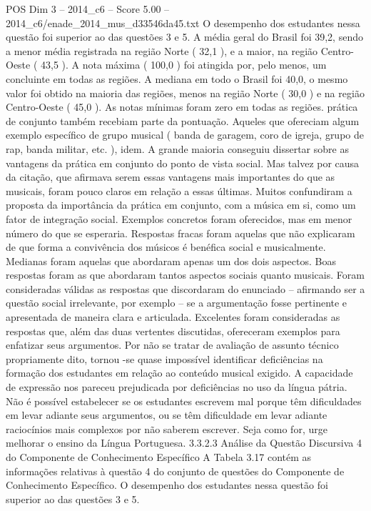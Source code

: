 \begin{textsample}{POS Dim 3 – 2014\_c6 – Score 5.00 – 2014\_c6/enade\_2014\_mus\_d33546da45.txt}
O desempenho dos estudantes nessa questão foi superior ao das questões 3 e 5.
A média geral do Brasil foi 39,2, sendo a menor média registrada na região Norte ( 32,1 ), e a maior, na região Centro-Oeste ( 43,5 ).
A nota máxima ( 100,0 ) foi atingida por, pelo menos, um concluinte em todas as regiões.
A mediana em todo o Brasil foi 40,0, o mesmo valor foi obtido na maioria das regiões, menos na região Norte ( 30,0 ) e na região Centro-Oeste ( 45,0 ).
As notas mínimas foram zero em todas as regiões. prática de conjunto também recebiam parte da pontuação.
Aqueles que ofereciam algum exemplo específico de grupo musical ( banda de garagem, coro de igreja, grupo de rap, banda militar, etc. ), idem.
A grande maioria conseguiu dissertar sobre as vantagens da prática em conjunto do ponto de vista social.
Mas talvez por causa da citação, que afirmava serem essas vantagens mais importantes do que as musicais, foram pouco claros em relação a essas últimas.
Muitos confundiram a proposta da importância da prática em conjunto, com a música em si, como um fator de integração social.
Exemplos concretos foram oferecidos, mas em menor número do que se esperaria.
Respostas fracas foram aquelas que não explicaram de que forma a convivência dos músicos é benéfica social e musicalmente.
Medianas foram aquelas que abordaram apenas um dos dois aspectos.
Boas respostas foram as que abordaram tantos aspectos sociais quanto musicais.
Foram consideradas válidas as respostas que discordaram do enunciado – afirmando ser a questão social irrelevante, por exemplo – se a argumentação fosse pertinente e apresentada de maneira clara e articulada.
Excelentes foram consideradas as respostas que, além das duas vertentes discutidas, ofereceram exemplos para enfatizar seus argumentos.
Por não se tratar de avaliação de assunto técnico propriamente dito, tornou -se quase impossível identificar deficiências na formação dos estudantes em relação ao conteúdo musical exigido.
A capacidade de expressão nos pareceu prejudicada por deficiências no uso da língua pátria.
Não é possível estabelecer se os estudantes escrevem mal porque têm dificuldades em levar adiante seus argumentos, ou se têm dificuldade em levar adiante raciocínios mais complexos por não saberem escrever.
Seja como for, urge melhorar o ensino da Língua Portuguesa. 3.3.2.3 Análise da Questão Discursiva 4 do Componente de Conhecimento Específico A Tabela 3.17 contém as informações relativas à questão 4 do conjunto de questões do Componente de Conhecimento Específico.
O desempenho dos estudantes nessa questão foi superior ao das questões 3 e 5.

\end{textsample}
